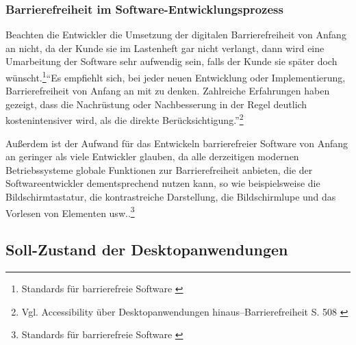 

\subsubsection{Barrierefreiheit im Software-Entwicklungsprozess}
Beachten die Entwickler die Umsetzung der digitalen Barrierefreiheit von Anfang an nicht, da der Kunde sie im Lastenheft gar nicht verlangt, dann wird eine Umarbeitung der Software sehr aufwendig sein, falls der Kunde sie später doch wünscht.\footnote{Standards für barrierefreie Software \cite{DEVINSIDER}}"`Es empfiehlt sich, bei jeder neuen Entwicklung oder Implementierung, Barrierefreiheit von Anfang an mit zu denken. Zahlreiche Erfahrungen haben gezeigt, dass die Nachrüstung oder Nachbesserung in der Regel deutlich kostenintensiver wird, als die direkte Berücksichtigung."'\footnote{Vgl. Accessibility über Desktopanwendungen hinaus–Barrierefreiheit S. 508 \cite{buhler2017accessibility}}
 
Außerdem ist der Aufwand für das Entwickeln barrierefreier Software von Anfang an geringer als viele Entwickler glauben, da alle  derzeitigen modernen Betriebssysteme globale Funktionen zur Barrierefreiheit anbieten, die der Softwareentwickler dementsprechend nutzen kann, so wie beispielsweise die Bildschirmtastatur, die kontrastreiche Darstellung, die Bildschirmlupe und das Vorlesen von Elementen usw..\footnote{Standards für barrierefreie Software \cite{DEVINSIDER}}

\subsection{Soll-Zustand der Desktopanwendungen}
\label{subsec: Soll-Zustand der Desktopanwendungen}

